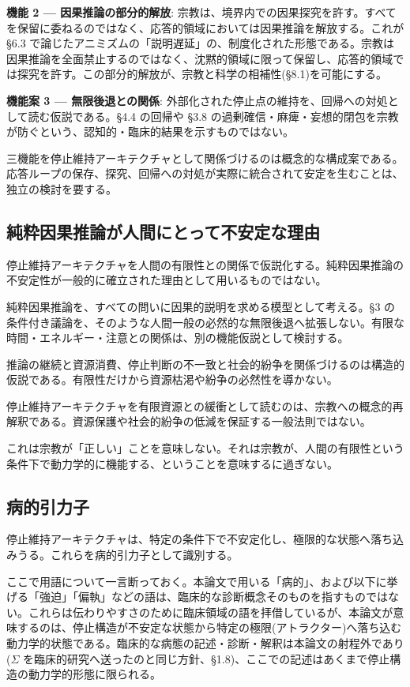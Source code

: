 \textbf{機能 2 — 因果推論の部分的解放}:
宗教は、境界内での因果探究を許す。すべてを保留に委ねるのではなく、応答的領域においては因果推論を解放する。これが \S{}6.3 で論じたアニミズムの「説明遅延」の、制度化された形態である。宗教は因果推論を全面禁止するのではなく、沈黙的領域に限って保留し、応答的領域では探究を許す。この部分的解放が、宗教と科学の相補性(\S{}8.1)を可能にする。

\textbf{機能案 3 — 無限後退との関係}:
外部化された停止点の維持を、回帰への対処として読む仮説である。\S{}4.4 の回帰や \S{}3.8 の過剰確信・麻痺・妄想的閉包を宗教が防ぐという、認知的・臨床的結果を示すものではない。

三機能を停止維持アーキテクチャとして関係づけるのは概念的な構成案である。応答ループの保存、探究、回帰への対処が実際に統合されて安定を生むことは、独立の検討を要する。

\bigskip


\subsection{純粋因果推論が人間にとって不安定な理由}


停止維持アーキテクチャを人間の有限性との関係で仮説化する。純粋因果推論の不安定性が一般的に確立された理由として用いるものではない。

純粋因果推論を、すべての問いに因果的説明を求める模型として考える。\S{}3 の条件付き議論を、そのような人間一般の必然的な無限後退へ拡張しない。有限な時間・エネルギー・注意との関係は、別の機能仮説として検討する。

推論の継続と資源消費、停止判断の不一致と社会的紛争を関係づけるのは構造的仮説である。有限性だけから資源枯渇や紛争の必然性を導かない。

停止維持アーキテクチャを有限資源との緩衝として読むのは、宗教への概念的再解釈である。資源保護や社会的紛争の低減を保証する一般法則ではない。

これは宗教が「正しい」ことを意味しない。それは宗教が、人間の有限性という条件下で動力学的に機能する、ということを意味するに過ぎない。

\bigskip


\subsection{病的引力子}


停止維持アーキテクチャは、特定の条件下で不安定化し、極限的な状態へ落ち込みうる。これらを病的引力子として識別する。

ここで用語について一言断っておく。本論文で用いる「病的」、および以下に挙げる「強迫」「偏執」などの語は、臨床的な診断概念そのものを指すものではない。これらは伝わりやすさのために臨床領域の語を拝借しているが、本論文が意味するのは、停止構造が不安定な状態から特定の極限(アトラクター)へ落ち込む動力学的状態である。臨床的な病態の記述・診断・解釈は本論文の射程外であり($\Sigma$ を臨床的研究へ送ったのと同じ方針、\S{}1.8)、ここでの記述はあくまで停止構造の動力学的形態に限られる。

